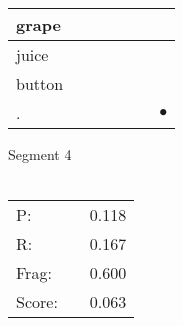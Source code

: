 \documentclass[landscape]{article}
\newcommand{\ssp}{\hspace{2pt}}
\newcommand{\mex}{\cellcolor{g}$\bullet$}
\begin{document}
\begin{tabular}{|l|p{10pt}|p{10pt}|p{10pt}|p{10pt}|p{10pt}|p{10pt}|}
\hline
\ssp grape \ssp&\hspace{2pt}&\hspace{2pt}&\hspace{2pt}&\hspace{2pt}&\hspace{2pt}&\hspace{2pt}\\
\hline
\ssp juice \ssp&\hspace{2pt}&\hspace{2pt}&\hspace{2pt}&\hspace{2pt}&\hspace{2pt}&\hspace{2pt}\\
\hline
\ssp button \ssp&\hspace{2pt}&\hspace{2pt}&\hspace{2pt}&\hspace{2pt}&\hspace{2pt}&\hspace{2pt}\\
\hline
\ssp \cellcolor{ref5}. \ssp&\hspace{2pt}&\hspace{2pt}&\hspace{2pt}&\hspace{2pt}&\hspace{2pt}&\hspace{2pt}\mex\\
\hline
\end{tabular}

\vspace{6pt}
\noindent Segment 4\\\\
\noindent\begin{tabular}{lm{12pt}r}
\hline
P:&&0.118\\
R:&&0.167\\
Frag:&&0.600\\
Score:&&0.063\\
\end{tabular}

\newpage
\end{document}

